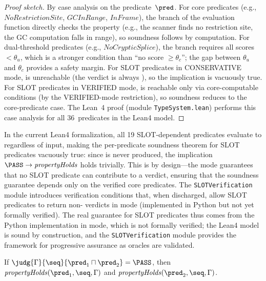 \begin{proof}[Proof sketch]
By case analysis on the predicate~$\pred$.
For core predicates (e.g., $\mathit{NoRestrictionSite}$,
$\mathit{GCInRange}$, $\mathit{InFrame}$), the \PASS{} branch of
the evaluation function directly checks the property (e.g., the
scanner finds no restriction site, the GC computation falls in range),
so soundness follows by computation.
For dual-threshold predicates (e.g., $\mathit{NoCrypticSplice}$),
the \PASS{} branch requires all scores $< \theta_u$, which is a
stronger condition than ``no score $\ge \theta_c$''; the gap between
$\theta_u$ and $\theta_c$ provides a safety margin.
For SLOT predicates in CONSERVATIVE mode, \PASS{} is unreachable
(the verdict is always \UNCERTAIN{}), so the implication is vacuously
true.
For SLOT predicates in VERIFIED mode, \PASS{} is reachable only via
core-computable conditions (by the VERIFIED-mode restriction), so
soundness reduces to the core-predicate case.
The Lean~4 proof (module \texttt{TypeSystem.lean}) performs this case
analysis for all 36~predicates in the Lean4 model.
\end{proof}

\begin{remark}\label{rem:vacuous-slot}
In the current Lean4 formalization, all 19 SLOT-dependent predicates
evaluate to \UNCERTAIN{} regardless of input, making the per-predicate
soundness theorem for SLOT predicates vacuously true: since \PASS{} is
never produced, the implication $\PASS \to \mathit{propertyHolds}$ holds
trivially. This is by design---the \CONSERVATIVE{} mode guarantees that
no SLOT predicate can contribute to a \PASS{} verdict, ensuring that the
soundness guarantee depends only on the verified core predicates. The
\texttt{SLOTVerification} module introduces verification conditions that,
when discharged, allow SLOT predicates to return non-\UNCERTAIN{} verdicts
in \VERIFIED{} mode (implemented in Python but not yet formally verified).
The real guarantee for SLOT predicates thus comes from the Python
implementation in \VERIFIED{} mode, which is not formally verified; the
Lean4 model is sound by construction, and the \texttt{SLOTVerification}
module provides the framework for progressive assurance as oracles are
validated.
\end{remark}

\begin{corollary}\label{cor:comp}
If\/ $\judg{\Gamma}{\seq}{\pred_1 \sqcap \pred_2} = \PASS$, then
$\mathit{propertyHolds}(\pred_1, \seq, \Gamma)$ and
$\mathit{propertyHolds}(\pred_2, \seq, \Gamma)$.
\end{corollary}


